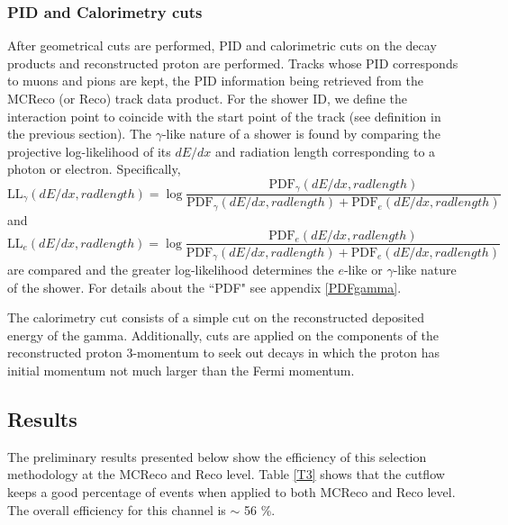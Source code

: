 \documentclass[a4paper, 10pt]{article}
\begin{document}
\subsubsection{PID and Calorimetry cuts }
\label{ID}
After geometrical cuts are performed, PID and calorimetric cuts on the decay products and reconstructed proton are performed. Tracks whose PID corresponds to muons and pions are kept, the PID information being retrieved from the MCReco (or Reco) track data product. For the shower ID, we define the interaction point to coincide with the start point of the track (see definition in the previous section). The $\gamma$-like nature of a shower is found by comparing the projective log-likelihood of its $dE/dx$ and radiation length corresponding to a photon or electron.
Specifically, 
\[\text{LL}_{\gamma}(dE/dx, rad length) = \log \frac{ \text{PDF}_{\gamma}(dE/dx, rad length) }{ \text{PDF}_{\gamma}(dE/dx, rad length) + \text{PDF}_{e}(dE/dx, rad length) }\]
and
\[\text{LL}_{e}(dE/dx, rad length) = \log \frac{ \text{PDF}_{e}(dE/dx, rad length) }{ \text{PDF}_{\gamma}(dE/dx, rad length) + \text{PDF}_{e}(dE/dx, rad length) }\]
are compared and the greater log-likelihood determines the $e$-like or $\gamma$-like nature of the shower. For details about the ``PDF"  see appendix \ref{PDFgamma}.

The calorimetry cut consists of a simple cut on the reconstructed deposited energy of the gamma. Additionally, cuts are applied on the components of the reconstructed proton 3-momentum to seek out decays in which the proton has initial momentum not much larger than the Fermi momentum.

\subsection{Results}

The preliminary results presented below show the efficiency of this selection methodology at the MCReco and Reco level. 
Table \ref{T3} shows that the cutflow keeps a good percentage of events when applied to both MCReco and Reco level.  The overall efficiency for this channel is $\sim$ 56 \%.
\end{document}
